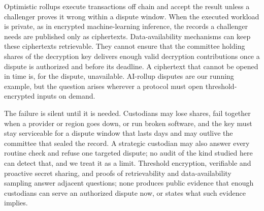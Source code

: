 \documentclass[Crown,sagev]{sagej}
\theoremstyle{plain}
\theoremstyle{definition}
\theoremstyle{remark}
\begin{document}
Optimistic rollups execute transactions off chain and accept the result unless a challenger proves it wrong within a dispute window\cite{kalodner2018arbitrum}. When the executed workload is private, as in encrypted machine-learning inference\cite{conway2024opml,eigenai2026}, the records a challenger needs are published only as ciphertexts. Data-availability mechanisms can keep these ciphertexts retrievable. They cannot ensure that the committee holding shares of the decryption key delivers enough valid decryption contributions once a dispute is authorized and before its deadline. A ciphertext that cannot be opened in time is, for the dispute, unavailable. AI-rollup disputes are our running example, but the question arises wherever a protocol must open threshold-encrypted inputs on demand.

The failure is silent until it is needed. Custodians may lose shares, fail together when a provider or region goes down, or run broken software, and the key must stay serviceable for a dispute window that lasts days and may outlive the committee that sealed the record. A strategic custodian may also answer every routine check and refuse one targeted dispute; no audit of the kind studied here can detect that, and we treat it as a limit. Threshold encryption, verifiable and proactive secret sharing, and proofs of retrievability and data-availability sampling\cite{desmedt1990threshold,feldman1987vss,schoenmakers1999pvss,herzberg1995proactive,juels2007por,albassam2021fraud} answer adjacent questions; none produces public evidence that enough custodians can serve an authorized dispute now, or states what such evidence implies.
\end{document}
